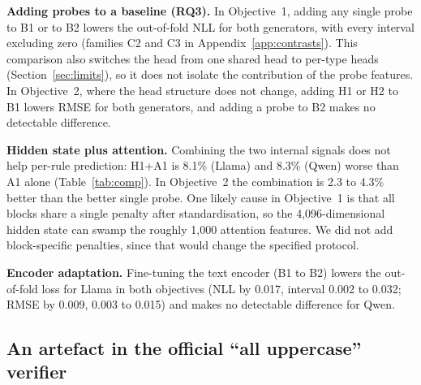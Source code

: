 \documentclass[10pt]{article}
\begin{document}
\textbf{Adding probes to a baseline (RQ3).} In Objective~1, adding any single probe to B1 or to B2 lowers the
out-of-fold NLL for both generators, with every interval excluding zero (families C2 and C3 in
Appendix~\ref{app:contrasts}). This comparison also switches the head from one shared head to per-type heads
(Section~\ref{sec:limits}), so it does not isolate the contribution of the probe features. In Objective~2, where the
head structure does not change, adding H1 or H2 to B1 lowers RMSE for both generators, and adding a probe to B2 makes
no detectable difference.

\textbf{Hidden state plus attention.} Combining the two internal signals does not help per-rule prediction: H1+A1 is
8.1\% (Llama) and 8.3\% (Qwen) worse than A1 alone (Table~\ref{tab:comp}). In Objective~2 the combination is 2.3 to
4.3\% better than the better single probe. One likely cause in Objective~1 is that all blocks share a single penalty
after standardisation, so the 4,096-dimensional hidden state can swamp the roughly 1,000 attention features. We did
not add block-specific penalties, since that would change the specified protocol.

\textbf{Encoder adaptation.} Fine-tuning the text encoder (B1 to B2) lowers the out-of-fold loss for Llama in both
objectives (NLL by 0.017, interval 0.002 to 0.032; RMSE by 0.009, 0.003 to 0.015) and makes no detectable difference
for Qwen.

\subsection{An artefact in the official ``all uppercase'' verifier}
\label{sec:audit}

\begin{table}[t]
\centering\small
\caption{Audit of the ``all uppercase'' rule on the training groups. The official check requires the response to be
upper case and a language detector to return English. ``Language check only'': responses that are entirely upper case
but fail the language step, with their share of all violations of this rule. ``Corrected'': violation rate if those
responses are counted as following the rule.}
\label{tab:ec}

\end{table}
\end{document}
